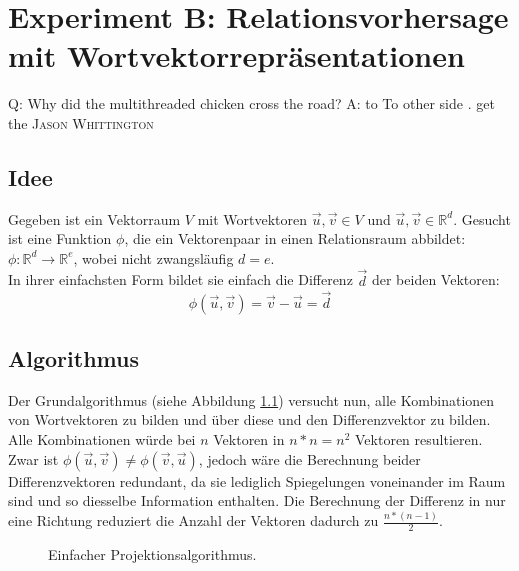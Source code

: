 
\chapter{Experiment B: Relationsvorhersage mit Wortvektorrepräsentationen} %

\label{Chapter7} %


\begin{itquote}
Q: Why did the multithreaded chicken cross the road?
A: to To other side . get the
\flushright
\textsc{Jason Whittington}
\end{itquote}

\section{Idee}

Gegeben ist ein Vektorraum $V$ mit Wortvektoren $\vec{u}, \vec{v} \in V$ und $\vec{u},\vec{v}\in\mathbb{R}^d$.
Gesucht ist eine Funktion $\phi$, die ein Vektorenpaar in einen Relationsraum abbildet: $\phi: \mathbb{R}^d \to \mathbb{R}^e$, wobei
nicht zwangsläufig $d = e$.\\
In ihrer einfachsten Form bildet sie einfach die Differenz $\vec{d}$ der beiden Vektoren:
\begin{equation}
  \phi(\vec{u}, \vec{v}) = \vec{v} - \vec{u} = \vec{d}
\end{equation}

\section{Algorithmus}

Der Grundalgorithmus (siehe Abbildung \ref{fig:algo1}) versucht nun, alle Kombinationen von Wortvektoren zu bilden und über diese
und den Differenzvektor zu bilden. Alle Kombinationen würde bei $n$ Vektoren in $n * n = n^2$ Vektoren resultieren.
Zwar ist $\phi(\vec{u}, \vec{v}) \neq \phi(\vec{v}, \vec{u})$, jedoch wäre die Berechnung beider Differenzvektoren redundant,
da sie lediglich Spiegelungen voneinander im Raum sind und so diesselbe Information enthalten. Die Berechnung
der Differenz in nur eine Richtung reduziert die Anzahl der Vektoren dadurch zu $\frac{n * (n-1)}{2}$.

\begin{figure}[h]
  \centering
  \begin{algorithm}[H]
  \end{algorithm}
  \caption[Einfacher Projektionsalgorithmus]{Einfacher Projektionsalgorithmus.\label{fig:algo1}}
\end{figure}


